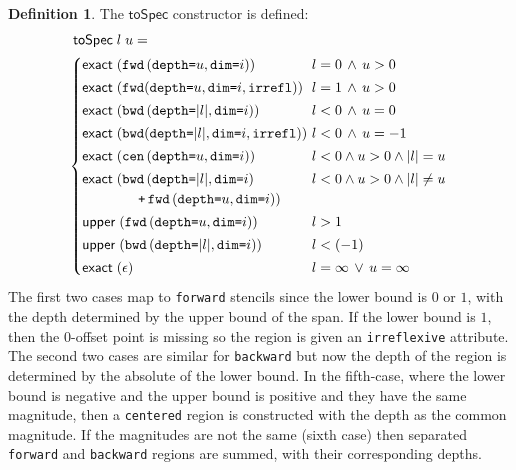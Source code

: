 \documentclass[9pt]{sigplanconf}
\newcounter{block}
\theoremstyle{definition}
\newtheorem{definition}[block]{Definition}
\newcommand{\term}[1]{\texttt{#1}}
\newcommand{\stenFwdS}[2]{\term{fwd} \, (\term{depth=}#1,
  \term{dim=}#2)}
\newcommand{\stenBwdS}[2]{\term{bwd} \, (\term{depth=}#1,
  \term{dim=}#2)}
\newcommand{\stenCenS}[2]{\term{cen} \, (\term{depth=}#1,
  \term{dim=}#2)}
\newcommand{\irreflS}{\texttt{irrefl}}
\newcommand{\stenFwdSR}[3]{\term{fwd} (\term{depth=}#1,
  \term{dim=}#2, #3)}
\newcommand{\stenBwdSR}[3]{\term{bwd} (\term{depth=}#1,
  \term{dim=}#2, #3)}
\newcommand{\vect}[1]{\textbf{#1}}
\begin{document}
\begin{definition} The $\mathsf{toSpec}$ constructor is defined:
\newcommand{\llower}{l}
\newcommand{\lupper}{u}
\begin{align*}
&\mathsf{toSpec} \; \llower \; \lupper = \\
&\hspace{-0.4em}\begin{cases}
\exact{\stenFwdS{\lupper}{i}}  & \llower = 0 \, \wedge \, \lupper > 0 \\[0.2em]
\exact{\stenFwdSR{\lupper}{i}{\irreflS}}\!\!\!\! & \llower = 1 \, \wedge \, \lupper > 0 \\[0.2em]
\exact{\stenBwdS{|\llower|}{i}}  & \llower < 0 \, \wedge \, \lupper = 0 \\[0.2em]
\exact{\stenBwdSR{|\llower|}{i}{\irreflS}}\!\!\!\! & \llower < 0 \, \wedge \, \lupper = -1 \\[0.2em]
\exact{\stenCenS{\lupper}{i}}& \llower < 0 \wedge \lupper > 0 \wedge |\llower| = \lupper \\[0.2em]
\exactR(\stenBwdS{|\llower|}{i} & \llower < 0 \wedge \lupper > 0  \wedge |\llower| \neq \lupper \\
\qquad\qquad \texttt{+} \, \stenFwdS{\lupper}{i}) & \\[0.2em]
\upperB{\stenFwdS{\lupper}{i}} & \llower > 1 \\[0.2em]
\upperB{\stenBwdS{|\llower|}{i}} \quad & \llower < (-1)
 \\[0.2em]
\exact{\epsilon} & \llower = \infty \, \vee \, \lupper = \infty
  \end{cases}
\end{align*}
The first two cases map to \texttt{forward} stencils since the lower
bound is $0$ or $1$, with the depth determined by the upper bound of
the span. If the lower bound is $1$, then the
$0$-offset point is missing so the region is given an
\texttt{irreflexive} attribute. The second two cases are similar for
\texttt{backward} but now the depth of the region is determined by the
absolute of the lower bound. In the fifth-case, where the lower bound
is negative and the upper bound is positive and they have the same
magnitude, then a \texttt{centered} region is constructed with
the depth as the common magnitude. If the magnitudes are not the same
(sixth case) then separated \texttt{forward} and \texttt{backward}
regions are summed, with their corresponding depths.


\end{definition}
\end{document}
